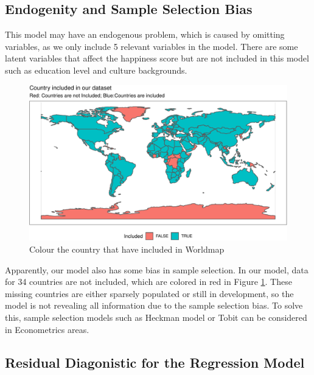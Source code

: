 \documentclass[11pt,a4paper,]{article}
\begin{document}
\hypertarget{endogenity-and-sample-selection-bias}{%
\subsection{Endogenity and Sample Selection Bias}\label{endogenity-and-sample-selection-bias}}

This model may have an endogenous problem, which is caused by omitting variables, as we only include 5 relevant variables in the model. There are some latent variables that affect the happiness score but are not included in this model such as education level and culture backgrounds.

\begin{figure}
\centering
\includegraphics{Assignment4_files/figure-latex/worldmapall-1.pdf}
\caption{\label{fig:worldmapall}Colour the country that have included in Worldmap}
\end{figure}

Apparently, our model also has some bias in sample selection. In our model, data for 34 countries are not included, which are colored in red in Figure \ref{fig:worldmapall}. These missing countries are either sparsely populated or still in development, so the model is not revealing all information due to the sample selection bias. To solve this, sample selection models such as Heckman model or Tobit can be considered in Econometrics areas.

\newpage

\hypertarget{residual-diagonistic-for-the-regression-model}{%
\subsection{Residual Diagonistic for the Regression Model}\label{residual-diagonistic-for-the-regression-model}}
\end{document}
